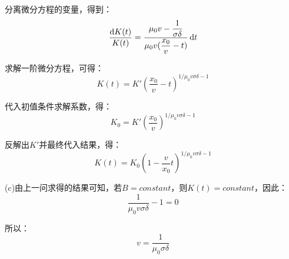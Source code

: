 \begin{solution}
    分离微分方程的变量，得到：
    \[\dfrac{\dif K(t)}{K(t)} = \dfrac{\mu_0 v - \dfrac{1}{\sigma \delta}}{\mu_0v(\dfrac{x_0}{v} - t)}\dif t\]

    求解一阶微分方程，可得：
    \[K(t) = K'(\dfrac{x_0}{v} - t)^{1/\mu_0 v \sigma\delta -1}\]

    代入初值条件求解系数，得：
    \[K_0 = K'(\dfrac{x_0}{v})^{1/\mu_0 v \sigma\delta -1}\]

    反解出$K'$并最终代入结果，得：
    \[K(t) = K_0(1-\dfrac{v}{x_0}t)^{1/\mu_0 v \sigma\delta -1}\]

    (c)由上一问求得的结果可知，若$B = constant$，则$K(t) = constant$，因此：
    \[\dfrac{1}{\mu_0 v \sigma\delta} - 1 = 0\]

    所以：
    \[v = \dfrac{1}{\mu_0 \sigma\delta}\]
\end{solution}